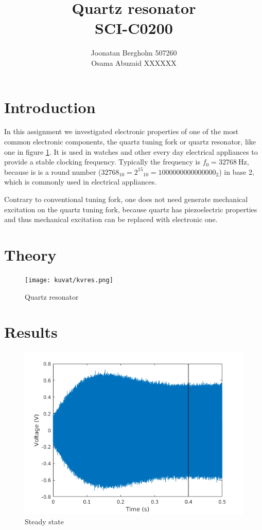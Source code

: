 \documentclass[12pt]{article}
\title{\textbf{Quartz resonator} \\ SCI-C0200}
\author{Joonatan Bergholm 507260 \\ Osama Abuzaid XXXXXX}
\begin{document}
\maketitle
\newpage


\tableofcontents
\newpage

\section{Introduction}

In this assignment we investigated electronic properties of one of the most common electronic components, the quartz tuning fork or quartz resonator, like one in figure \ref{fig:kvres}. It is used in watches and other every day electrical appliances to provide a stable clocking frequency. Typically the frequency is $f_0 = \SI{32768}{\hertz}$, because is is a round number ($32768_{10} = {2^{15}}_{10} = 1000000000000000_2$) in base 2, which is commonly used in electrical appliances.

Contrary to conventional tuning fork, one does not need generate mechanical excitation
on the quartz tuning fork, because quartz has piezoelectric properties and thus mechanical excitation can be replaced with electronic one.

\section{Theory}

\begin{figure}
	\centering
	\texttt{[image: kuvat/kvres.png]}
	\caption{Quartz resonator}
	\label{fig:kvres}
\end{figure}

\section{Results}

\begin{figure}
	\centering
	\includegraphics[width = \textwidth]{kuvat/steadystate.png}
	\caption{Steady state}
	\label{fig:steady}
\end{figure}
\end{document}
